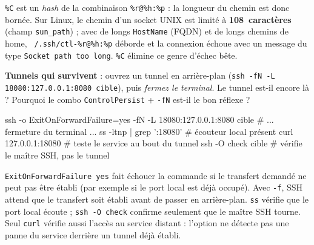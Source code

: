 \documentclass[a4paper,10pt]{exam}
\begin{document}
\begin{questions}
\begin{solution}
\texttt{\%C} est un \emph{hash} de la combinaison \texttt{\%r@\%h:\%p} : la longueur du
chemin est donc bornée. Sur Linux, le chemin d'un socket UNIX est limité à
\textbf{108~caractères} (champ \texttt{sun\_path}) ; avec de longs
\texttt{HostName} (FQDN) et de longs chemins de home,
\texttt{~/.ssh/ctl-\%r@\%h:\%p} déborde et la connexion échoue avec un message du type
\texttt{Socket path too long}. \texttt{\%C} élimine ce genre d'échec bête.
\end{solution}
\question \textbf{Tunnels qui survivent} : ouvrez un tunnel en arrière-plan
(\texttt{ssh -fN -L 18080:127.0.0.1:8080 cible}), puis \emph{fermez le terminal}.
Le tunnel est-il encore là ? Pourquoi le combo \texttt{ControlPersist} + \texttt{-fN} est-il
le bon réflexe ?
\begin{solution}
\begin{bashcode}
ssh -o ExitOnForwardFailure=yes -fN -L 18080:127.0.0.1:8080 cible
# ... fermeture du terminal ...
ss -ltnp | grep ':18080' # écouteur local présent
curl 127.0.0.1:18080    # teste le service au bout du tunnel
ssh -O check cible      # vérifie le maître SSH, pas le tunnel
\end{bashcode}
\texttt{ExitOnForwardFailure yes} fait échouer la commande si le transfert demandé ne peut
pas être établi (par exemple si le port local est déjà occupé). Avec \texttt{-f}, SSH attend
que le transfert soit établi avant de passer en arrière-plan. \texttt{ss} vérifie que le port
local écoute ; \texttt{ssh -O check} confirme seulement que le maître SSH tourne. Seul
\texttt{curl} vérifie aussi l'accès au service distant : l'option ne détecte pas une panne du
service derrière un tunnel déjà établi.


\end{solution}
\end{questions}
\end{document}
